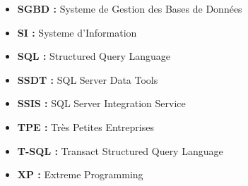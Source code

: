 \begin{itemize}
    \item \textbf{SGBD :} Systeme de Gestion des Bases de Données
    \item \textbf{SI :} Systeme d'Information
    \item \textbf{SQL :} Structured Query Language
    \item \textbf{SSDT :} SQL Server Data Tools
    \item \textbf{SSIS :} SQL Server Integration Service
    \item \textbf{TPE :} Très Petites Entreprises
    \item \textbf{T-SQL : } Transact Structured Query Language
    \item \textbf{XP :} Extreme Programming
\end{itemize}